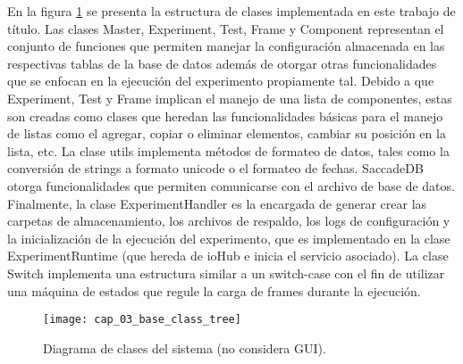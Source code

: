 \documentclass[\main/main.tex]{subfiles}
\begin{document}
		En la figura \ref{fig:03_base_class_tree} se presenta la estructura de clases implementada en este trabajo de título. Las clases Master, Experiment, Test, Frame y Component representan el conjunto de funciones que permiten manejar la configuración almacenada en las respectivas tablas de la base de datos además de otorgar otras funcionalidades que se enfocan en la ejecución del experimento propiamente tal. Debido a que Experiment, Test y Frame implican el manejo de una lista de componentes, estas son creadas como clases que heredan las funcionalidades básicas para el manejo de listas como el agregar, copiar o eliminar elementos, cambiar su posición en la lista, etc. La clase utils implementa métodos de formateo de datos, tales como la conversión de strings a formato unicode o el formateo de fechas. SaccadeDB otorga funcionalidades que permiten comunicarse con el archivo de base de datos. Finalmente, la clase ExperimentHandler es la encargada de generar crear las carpetas de almacenamiento, los archivos de respaldo, los logs de configuración y la inicialización de la ejecución del experimento, que es implementado en la clase ExperimentRuntime (que hereda de ioHub e inicia el servicio asociado). La clase Switch implementa una estructura similar a un switch-case con el fin de utilizar una máquina de estados que regule la carga de frames durante la ejecución.  
		\begin{figure}[H]
			\centering
			\texttt{[image: cap\_03\_base\_class\_tree]}
			\caption{Diagrama de clases del sistema (no considera GUI).}
			\label{fig:03_base_class_tree}
		\end{figure} 
\end{document}
